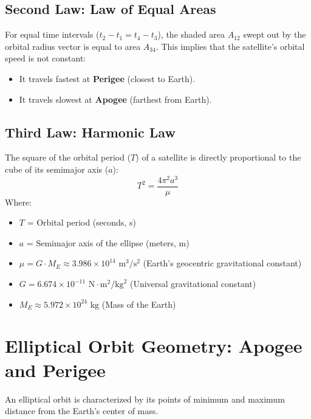 \documentclass[12pt,a4paper]{article}
\begin{document}
\subsection{Second Law: Law of Equal Areas}
For equal time intervals ($t_2 - t_1 = t_4 - t_3$), the shaded area $A_{12}$ swept out by the orbital radius vector is equal to area $A_{34}$. This implies that the satellite's orbital speed is not constant:
\begin{itemize}[leftmargin=*, noitemsep]
  \item It travels fastest at \textbf{Perigee} (closest to Earth).
  \item It travels slowest at \textbf{Apogee} (farthest from Earth).
\end{itemize}

\subsection{Third Law: Harmonic Law}
The square of the orbital period ($T$) of a satellite is directly proportional to the cube of its semimajor axis ($a$):
\begin{equation}
  T^2 = \frac{4\pi^2 a^3}{\mu}
\end{equation}
Where:
\begin{itemize}[leftmargin=*, label=$\bullet$, noitemsep]
  \item $T$ = Orbital period (seconds, s)
  \item $a$ = Semimajor axis of the ellipse (meters, m)
  \item $\mu = G \cdot M_E \approx 3.986 \times 10^{14} \text{ m}^3/\text{s}^2$ (Earth's geocentric gravitational constant)
  \item $G = 6.674 \times 10^{-11} \text{ N}\cdot\text{m}^2/\text{kg}^2$ (Universal gravitational constant)
  \item $M_E \approx 5.972 \times 10^{24} \text{ kg}$ (Mass of the Earth)
\end{itemize}

\section{Elliptical Orbit Geometry: Apogee and Perigee}

An elliptical orbit is characterized by its points of minimum and maximum distance from the Earth's center of mass.
\end{document}
